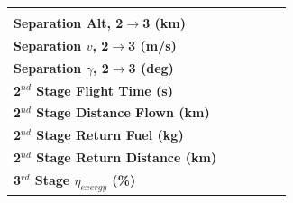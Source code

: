 \begin{table}[ht]
\begin{tabular}{l c c c c c }
		& \textbf{\secondExergyEffheatLimFourteenHundred}
		\\
		\textbf{Separation Alt, 2$\rightarrow$3 (km)}
		& \secondthirdSeparationAltheatLimStandard
		& \secondthirdSeparationAltheatLimSeventeenHundred
		& \secondthirdSeparationAltheatLimSixteenHundred
		& \secondthirdSeparationAltheatLimFifteenHundred
		& \secondthirdSeparationAltheatLimFourteenHundred
		\\
		\textbf{Separation $v$, 2$\rightarrow$3 (m/s)}
		& \secondthirdSeparationvheatLimStandard
		& \secondthirdSeparationvheatLimSeventeenHundred
		& \secondthirdSeparationvheatLimSixteenHundred
		& \secondthirdSeparationvheatLimFifteenHundred
		& \secondthirdSeparationvheatLimFourteenHundred
		\\
		\textbf{Separation $\gamma$, 2$\rightarrow$3 (deg)}
		& \secondthirdSeparationgammaheatLimStandard
		& \secondthirdSeparationgammaheatLimSeventeenHundred
		& \secondthirdSeparationgammaheatLimSixteenHundred
		& \secondthirdSeparationgammaheatLimFifteenHundred
		& \secondthirdSeparationgammaheatLimFourteenHundred
		\\
		\textbf{2$^{nd}$ Stage Flight Time (s)}
		& \secondFlightTimeheatLimStandard
		& \secondFlightTimeheatLimSeventeenHundred
		& \secondFlightTimeheatLimSixteenHundred
		& \secondFlightTimeheatLimFifteenHundred
		& \secondFlightTimeheatLimFourteenHundred
		\\
		\textbf{2$^{nd}$ Stage Distance Flown (km)}
		& \SecondDistheatLimStandard
		& \SecondDistheatLimSeventeenHundred
		& \SecondDistheatLimSixteenHundred
		& \SecondDistheatLimFifteenHundred
		& \SecondDistheatLimFourteenHundred
		\\
		\textbf{2$^{nd}$ Stage Return Fuel (kg)}
		& \returnFuelheatLimStandard
		& \returnFuelheatLimSeventeenHundred
		& \returnFuelheatLimSixteenHundred
		& \returnFuelheatLimFifteenHundred
		& \returnFuelheatLimFourteenHundred
		\\
		\textbf{2$^{nd}$ Stage Return Distance (km)}
		& \returnDistheatLimStandard
		& \returnDistheatLimSeventeenHundred
		& \returnDistheatLimSixteenHundred
		& \returnDistheatLimFifteenHundred
		& \returnDistheatLimFourteenHundred
		\\
		\hline 
		\textbf{3$^{rd}$ Stage $\eta_{exergy}$ (\%)}
		& \textbf{\thirddExergyEffheatLimStandard}
		& \textbf{\thirddExergyEffheatLimSeventeenHundred}
		& \textbf{\thirddExergyEffheatLimSixteenHundred}
		& \textbf{\thirddExergyEffheatLimFifteenHundred}
		& \textbf{\thirddExergyEffheatLimFourteenHundred}
		\\

\end{tabular}
\end{table}

